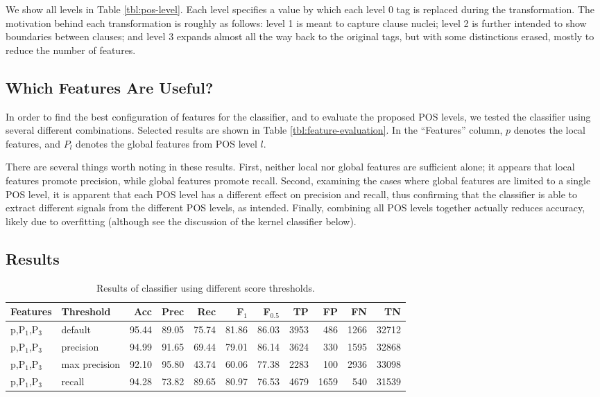 \documentclass[11pt]{article}
\begin{document}
We show all levels in Table \ref{tbl:pos-level}. Each level specifies
a value by which each level 0 tag is replaced during the
transformation. The motivation behind each transformation is roughly as follows: level
1 is meant to capture clause nuclei; level 2 is further intended to
show boundaries between clauses; and level 3 expands almost all the
way back to the original tags, but with some distinctions erased,
mostly to reduce the number of features.

\subsection{Which Features Are Useful?}
\label{sec-4-3}

In order to find the best configuration of features for the
classifier, and to evaluate the proposed POS levels, we tested the
classifier using several different combinations. Selected results are
shown in Table \ref{tbl:feature-evaluation}. In the ``Features'' column,
$p$ denotes the local features, and $P_{l}$ denotes the global
features from POS level $l$. 

There are several things worth noting in these results. First, neither
local nor global features are sufficient alone; it appears that local
features promote precision, while global features promote recall.
Second, examining the cases where global features are limited to a
single POS level, it is apparent that each POS level has a different
effect on precision and recall, thus confirming that the classifier is
able to extract different signals from the different POS levels, as
intended. Finally, combining all POS levels together actually reduces
accuracy, likely due to overfitting (although see the discussion of
the kernel classifier below).

\subsection{Results}
\label{sec-4-4}

\begin{table*}[htbp]

\begin{tabular}{llrrrrrrrrr}
Features & Threshold & Acc & Prec & Rec & F$_{\text{1}}$ & F$_{\text{0.5}}$ & TP & FP & FN & TN\\
\hline
p,P$_{\text{1}}$,P$_{\text{3}}$ & default & 95.44 & 89.05 & 75.74 & 81.86 & 86.03 & 3953 & 486 & 1266 & 32712\\
p,P$_{\text{1}}$,P$_{\text{3}}$ & precision & 94.99 & 91.65 & 69.44 & 79.01 & 86.14 & 3624 & 330 & 1595 & 32868\\
p,P$_{\text{1}}$,P$_{\text{3}}$ & max precision & 92.10 & 95.80 & 43.74 & 60.06 & 77.38 & 2283 & 100 & 2936 & 33098\\
p,P$_{\text{1}}$,P$_{\text{3}}$ & recall & 94.28 & 73.82 & 89.65 & 80.97 & 76.53 & 4679 & 1659 & 540 & 31539\\
\end{tabular}

\caption{Results of classifier using different score thresholds.}
\label{tbl:classifier-results-linear}
\end{table*}
\end{document}
